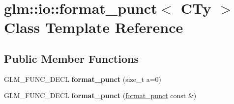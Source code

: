 \hypertarget{classglm_1_1io_1_1format__punct}{}\section{glm\+:\+:io\+:\+:format\+\_\+punct$<$ C\+Ty $>$ Class Template Reference}
\label{classglm_1_1io_1_1format__punct}
\subsection*{Public Member Functions}
\begin{DoxyCompactItemize}
\item 
\mbox{\label{classglm_1_1io_1_1format__punct_ae56e7a14fac2516658837281b9da4659}} 
G\+L\+M\+\_\+\+F\+U\+N\+C\+\_\+\+D\+E\+CL {\bfseries format\+\_\+punct} (size\+\_\+t a=0)
\item 
\mbox{\label{classglm_1_1io_1_1format__punct_a89a8c3cfb0b975f3dd8c0416101c59b7}} 
G\+L\+M\+\_\+\+F\+U\+N\+C\+\_\+\+D\+E\+CL {\bfseries format\+\_\+punct} (\hyperlink{classglm_1_1io_1_1format__punct}{format\+\_\+punct} const \&)
\end{DoxyCompactItemize}

